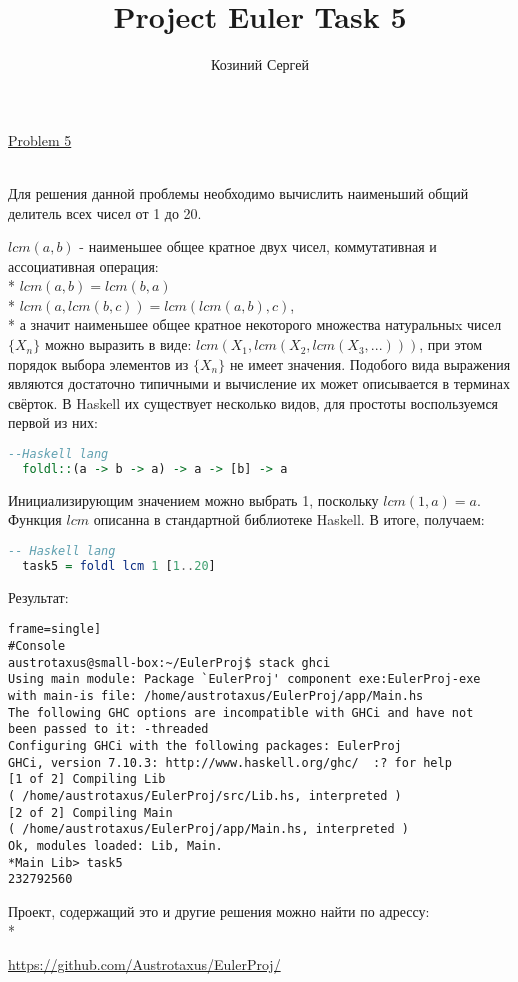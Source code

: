 \documentclass[11pt,a4paper]{article}
\title{Project Euler Task 5}
\author{Козиний Сергей}
\begin{document}
    
\maketitle
\href{''https://projecteuler.net/problem=5''}{Problem 5}

\\

Для решения данной проблемы необходимо вычислить наименьший общий делитель всех чисел от 1 до 20.

$lcm(a,b)$ - наименьшее общее кратное двух чисел, коммутативная и ассоциативная операция:\\*
$lcm(a,b) = lcm(b,a)$\\*
$lcm(a,lcm(b,c)) =lcm(lcm(a,b),c)$,\\*
а значит наименьшее общее кратное некоторого множества натуральныx чисел $\{X_n\}$ можно выразить в виде: $lcm(X_1,lcm(X_2,lcm(X_3,...)))$, при этом порядок выбора элементов из $\{X_n\}$ не имеет значения. Подобого вида выражения являются достаточно типичными и вычисление их может описывается в терминах свёрток. В Haskell их существует несколько видов, для простоты воспользуемся первой из них:
\begin{lstlisting}[language=Haskell, frame=single]
  --Haskell lang
  foldl::(a -> b -> a) -> a -> [b] -> a
\end{lstlisting}

Инициализирующим значением можно выбрать 1, поскольку $lcm(1,a)= a$. Функция $lcm$ описанна в стандартной библиотеке Haskell. В итоге, получаем:

\begin{lstlisting}[language=Haskell, frame=single]
  -- Haskell lang
  task5 = foldl lcm 1 [1..20]

\end{lstlisting}

Результат:
\begin{lstlisting}frame=single]
#Console
austrotaxus@small-box:~/EulerProj$ stack ghci
Using main module: Package `EulerProj' component exe:EulerProj-exe
with main-is file: /home/austrotaxus/EulerProj/app/Main.hs
The following GHC options are incompatible with GHCi and have not
been passed to it: -threaded
Configuring GHCi with the following packages: EulerProj
GHCi, version 7.10.3: http://www.haskell.org/ghc/  :? for help
[1 of 2] Compiling Lib
( /home/austrotaxus/EulerProj/src/Lib.hs, interpreted )
[2 of 2] Compiling Main
( /home/austrotaxus/EulerProj/app/Main.hs, interpreted )
Ok, modules loaded: Lib, Main. 
*Main Lib> task5
232792560
\end{lstlisting}


Проект, содержащий это и другие решения можно найти по адрессу:\\*

\url{https://github.com/Austrotaxus/EulerProj/}
\end{document}
